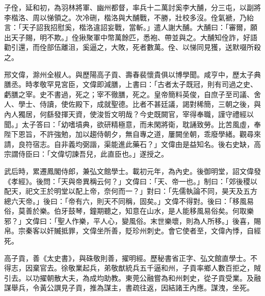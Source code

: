 \begin{pinyinscope}
 子佺，延和初，為羽林將軍、幽州都督，率兵十二萬討奚李大酺，分三屯，以副將李楷洛、周以悌領之。次冷硎，楷洛與大酺戰，不勝，壯校多沒。佺氣褫，乃紿言：「天子詔我招慰奚，楷洛違詔妄戰，當斬。」遣人謝大酺。大酺曰：「審爾，願出天子賜，明不欺。」佺揪聚軍中幣萬餘匹，悉袍、帶並與之。大酺知佺詐，好語勸引還，而佺部伍離沮，奚逼之，大敗，死者數萬。佺、以悌同見獲，送默啜所殺之。



 邢文偉，滁州全椒人。與歷陽高子貢、壽春裴懷貴俱以博學聞。咸亨中，歷太子典膳丞。時孝敬罕見宮臣，文偉即減膳，上書曰：「古者太子既冠，則有司過之史、虧膳之宰。史不書過，死之；宰不徹膳，死之。皇帝簡料英俊，自庶子至司議、舍人、學士、侍讀，使佐殿下，成就聖德。比者不甚廷議，謁對稀簡，三朝之後，與內人獨居，何繇發揮天資，使浚哲文明哉？今史既闕官，宰得奉職，謹守禮經以聞。」太子答曰：「幼嗜墳典，欲研精極意，而未閑將衛，耽誦致勞。比苦風虛，奉陛下恩旨，不許強勉，加以趨侍朝夕，無自專之道，屢闕坐朝，乖廢學緒。觀尋來請，良符宿志。自非義均弼諧，渠能進此藥石？」文偉由是益知名。後右史缺，高宗謂侍臣曰：「文偉切諫吾兒，此直臣也。」遂授之。



 武后時，累遷鳳閣侍郎，兼弘文館學士。載初元年，為內史。後御明堂，詔文偉發《孝經》。後問：「天與帝異稱云何？」文偉曰：「天、帝一也。」制曰：「郊後稷以配天，祀文王於明堂以配上帝，奈何而一？」對曰：「先儒執論不同，昊天及五方總六天帝。」後曰：「帝有六，則天不同稱，固矣。」文偉不得對。後曰：「移風易俗，莫善於樂。伯牙鼓琴，鐘期聽之，知意在山水，是人能移風易俗矣。何取樂邪？」文偉曰：「聖人作樂，平人心，變風俗。末世樂壞，則為人所移。」後喜，賜帛。宗秦客以奸贓抵罪，文偉坐所善，貶珍州刺史。會它使者至，文偉內悸，自經死。



 高子貢，善《太史書》，與硃敬則善，擢明經。歷秘書省正字、弘文館直學士。不得志，因棄官去。徐敬業起兵，弟敬猷統兵五千逼和州，子貢率鄉人數百拒之，賊引去。以功擢朝散大夫，為成均助教。東莞公融嘗為和州刺史，從子貢受業。及融謀舉兵，令黃公譔見子貢，推為謀主，書疏往返，因結諸王內應。謀洩，坐死。



\end{pinyinscope}